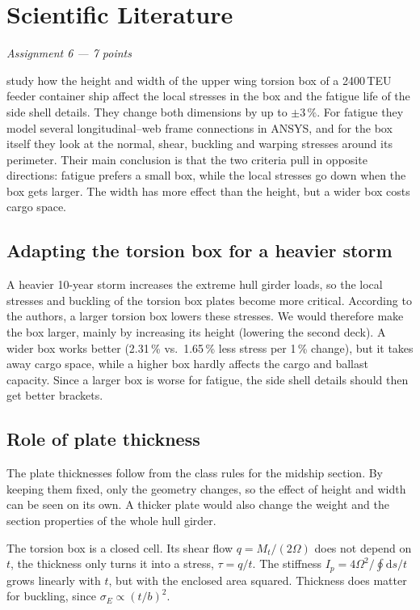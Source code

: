 \chapter{Scientific Literature}
\label{ch:assignment6}

\begingroup\itshape Assignment 6 --- 7 points\endgroup

\bigskip
\textcite{SilvaCampillo2022} study how the height and width of the upper wing torsion box of a 2400\,TEU feeder container ship affect the local stresses in the box and the fatigue life of the side shell details. They change both dimensions by up to $\pm3\,\%$. For fatigue they model several longitudinal--web frame connections in ANSYS, and for the box itself they look at the normal, shear, buckling and warping stresses around its perimeter. Their main conclusion is that the two criteria pull in opposite directions: fatigue prefers a small box, while the local stresses go down when the box gets larger. The width has more effect than the height, but a wider box costs cargo space.

\section{Adapting the torsion box for a heavier storm}
\label{sec:a6-1}


A heavier 10-year storm increases the extreme hull girder loads, so the local stresses and buckling of the torsion box plates become more critical. According to the authors, a larger torsion box lowers these stresses. We would therefore make the box larger, mainly by increasing its height (lowering the second deck). A wider box works better (2.31\,\% vs.\ 1.65\,\% less stress per 1\,\% change), but it takes away cargo space, while a higher box hardly affects the cargo and ballast capacity. Since a larger box is worse for fatigue, the side shell details should then get better brackets.

\section{Role of plate thickness}
\label{sec:a6-2}

The plate thicknesses follow from the class rules for the midship section. By keeping them fixed, only the geometry changes, so the effect of height and width can be seen on its own. A thicker plate would also change the weight and the section properties of the whole hull girder.

The torsion box is a closed cell. Its shear flow $q = M_t/(2\Omega)$ does not depend on $t$, the thickness only turns it into a stress, $\tau = q/t$. The stiffness $I_p = 4\Omega^2/\oint \mathrm{d}s/t$ grows linearly with $t$, but with the enclosed area squared. Thickness does matter for buckling, since $\sigma_E \propto (t/b)^2$.